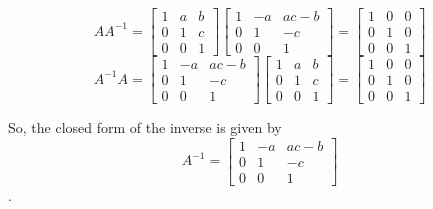 \documentclass[12pt,letterpaper]{article}
\begin{document}
\begin{enumerate}
\begin{enumerate}
          \[AA^{-1} =
            \begin{bmatrix}
              1 & a & b \\
              0 & 1 & c \\
              0 & 0 & 1
            \end{bmatrix}
            \begin{bmatrix}
              1 & -a & ac-b \\
              0 & 1 & -c \\
              0 & 0 & 1
            \end{bmatrix}
            =
            \begin{bmatrix}
              1 & 0 & 0 \\
              0 & 1 & 0 \\
              0 & 0 & 1
            \end{bmatrix}
          \]
          \[A^{-1}A =
            \begin{bmatrix}
              1 & -a & ac-b \\
              0 & 1 & -c \\
              0 & 0 & 1
            \end{bmatrix}
            \begin{bmatrix}
              1 & a & b \\
              0 & 1 & c \\
              0 & 0 & 1
            \end{bmatrix}
            =
            \begin{bmatrix}
              1 & 0 & 0 \\
              0 & 1 & 0 \\
              0 & 0 & 1
            \end{bmatrix}
          \]

          So, the closed form of the inverse is given by
          \[A^{-1} =
            \begin{bmatrix}
              1 & -a & ac-b \\
              0 & 1 & -c \\
              0 & 0 & 1
            \end{bmatrix}
          \].


\end{enumerate}
\end{enumerate}
\end{document}
